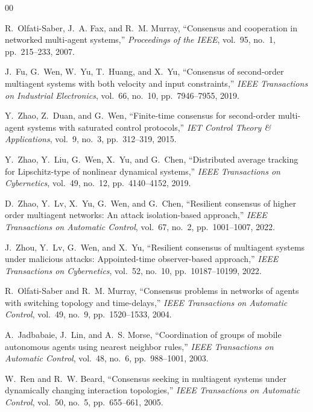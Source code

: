 \documentclass[conference]{IEEEtran}
\begin{document}
	\begin{thebibliography}{00}
		
		R.~Olfati-Saber, J.~A. Fax, and R.~M. Murray,
		``Consensus and cooperation in networked multi-agent systems,''
		\emph{Proceedings of the IEEE},
		vol.~95, no.~1, pp.~215--233, 2007.
		
		J.~Fu, G.~Wen, W.~Yu, T.~Huang, and X.~Yu,
		``Consensus of second-order multiagent systems with both velocity
		and input constraints,''
		\emph{IEEE Transactions on Industrial Electronics},
		vol.~66, no.~10, pp.~7946--7955, 2019.
		
		Y.~Zhao, Z.~Duan, and G.~Wen,
		``Finite-time consensus for second-order multi-agent systems with
		saturated control protocols,''
		\emph{IET Control Theory \& Applications},
		vol.~9, no.~3, pp.~312--319, 2015.
		
		Y.~Zhao, Y.~Liu, G.~Wen, X.~Yu, and G.~Chen,
		``Distributed average tracking for Lipschitz-type of nonlinear
		dynamical systems,''
		\emph{IEEE Transactions on Cybernetics},
		vol.~49, no.~12, pp.~4140--4152, 2019.
		
		D.~Zhao, Y.~Lv, X.~Yu, G.~Wen, and G.~Chen,
		``Resilient consensus of higher order multiagent networks:
		An attack isolation-based approach,''
		\emph{IEEE Transactions on Automatic Control},
		vol.~67, no.~2, pp.~1001--1007, 2022.
		
		J.~Zhou, Y.~Lv, G.~Wen, and X.~Yu,
		``Resilient consensus of multiagent systems under malicious
		attacks: Appointed-time observer-based approach,''
		\emph{IEEE Transactions on Cybernetics},
		vol.~52, no.~10, pp.~10187--10199, 2022.
		
		R.~Olfati-Saber and R.~M. Murray,
		``Consensus problems in networks of agents with switching topology
		and time-delays,''
		\emph{IEEE Transactions on Automatic Control},
		vol.~49, no.~9, pp.~1520--1533, 2004.
		
		A.~Jadbabaie, J.~Lin, and A.~S. Morse,
		``Coordination of groups of mobile autonomous agents using nearest
		neighbor rules,''
		\emph{IEEE Transactions on Automatic Control},
		vol.~48, no.~6, pp.~988--1001, 2003.
		
		W.~Ren and R.~W. Beard,
		``Consensus seeking in multiagent systems under dynamically
		changing interaction topologies,''
		\emph{IEEE Transactions on Automatic Control},
		vol.~50, no.~5, pp.~655--661, 2005.
		

\end{thebibliography}
\end{document}
